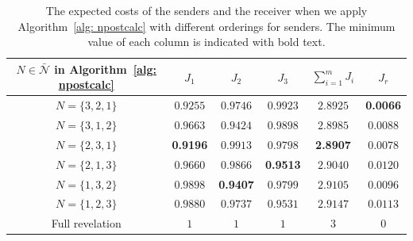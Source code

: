 \documentclass[12pt,journal,onecolumn]{IEEEtran}
\begin{document}
\begin{table}[t]
\small
\centering
	\begin{center}
		\begin{tabular}{ | c | c | c | c |c |c |}
			\hline
			 $N \in \bar{\mathcal{N}}$ in Algorithm~\ref{alg: npostcalc} & $J_{1}$  & $J_{2}$ & $J_{3}$& $\sum_{i=1}^{m}J_{i}$ & $J_{r}$\\ \hline
			$N= \{3	,2,1\}$
			 & $0.9255$ & $0.9746$ & $0.9923$ & $ 2.8925$ & \textbf{0.0066}  \\ \hline
			$N= \{3	,1,2\}$
			 & $0.9663$ & $0.9424$ & $0.9898$ & $2.8985$ & $ 0.0088$ \\ \hline 
			 $N= \{2	,3,1\}$
			 & \textbf{0.9196} & $0.9913$ & $0.9798$   & \textbf{2.8907} & $0.0078$\\ \hline 
			 $N= \{2	,1,3\}$
			 & $0.9660$ & $0.9866$ & \textbf{0.9513} & $2.9040 $
			 & $0.0120$\\ \hline 
			 $N= \{1	,3,2\}$
			 & $0.9898$ & \textbf{0.9407} & $0.9799$ & $2.9105$ 
			 & $0.0096$\\ \hline 
			 $N= \{1	,2,3\}$
			 & $0.9880$ & $0.9737$ & $0.9531$ & $2.9147$& $0.0113$\\ \hline 
			 Full revelation
			 & $1$ & $1$ & $1$ & $3$& $0$  \\ \hline
		\end{tabular}
	\end{center}
	\caption{The expected costs of the senders and the receiver when we apply Algorithm~\ref{alg: npostcalc} with different orderings for senders. The minimum value of each column is indicated with bold text. }
	\label{table:results_2}
	\vspace{-0.5cm}
\end{table}
\end{document}
